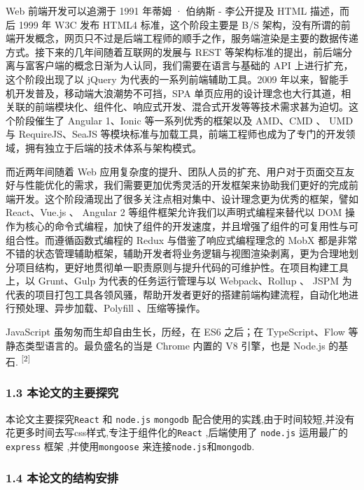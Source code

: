\documentclass[]{article}
\begin{document}
Web 前端开发可以追溯于 1991 年蒂姆 · 伯纳斯 - 李公开提及 HTML 描述，而后
1999 年 W3C 发布 HTML4 标准，这个阶段主要是 B/S
架构，没有所谓的前端开发概念，网页只不过是后端工程师的顺手之作，服务端渲染是主要的数据传递方式。接下来的几年间随着互联网的发展与
REST
等架构标准的提出，前后端分离与富客户端的概念日渐为人认同，我们需要在语言与基础的
API 上进行扩充，这个阶段出现了以 jQuery 为代表的一系列前端辅助工具。2009
年以来，智能手机开发普及，移动端大浪潮势不可挡，SPA
单页应用的设计理念也大行其道，相关联的前端模块化、组件化、响应式开发、混合式开发等等技术需求甚为迫切。这个阶段催生了
Angular 1、Ionic 等一系列优秀的框架以及 AMD、CMD 、 UMD 与
RequireJS、SeaJS
等模块标准与加载工具，前端工程师也成为了专门的开发领域，拥有独立于后端的技术体系与架构模式。

而近两年间随着 Web
应用复杂度的提升、团队人员的扩充、用户对于页面交互友好与性能优化的需求，我们需要更加优秀灵活的开发框架来协助我们更好的完成前端开发。这个阶段涌现出了很多关注点相对集中、设计理念更为优秀的框架，譬如
React、Vue.js 、 Angular 2 等组件框架允许我们以声明式编程来替代以 DOM
操作为核心的命令式编程，加快了组件的开发速度，并且增强了组件的可复用性与可组合性。而遵循函数式编程的
Redux 与借鉴了响应式编程理念的 MobX
都是非常不错的状态管理辅助框架，辅助开发者将业务逻辑与视图渲染剥离，更为合理地划分项目结构，更好地贯彻单一职责原则与提升代码的可维护性。在项目构建工具上，以
Grunt、Gulp 为代表的任务运行管理与以 Webpack、Rollup 、 JSPM
为代表的项目打包工具各领风骚，帮助开发者更好的搭建前端构建流程，自动化地进行预处理、异步加载、Polyfill
、压缩等操作。

JavaScript 虽匆匆而生却自由生长，历经，在 ES6 之后；在 TypeScript、Flow
等静态类型语言的。最负盛名的当是 Chrome 内置的 V8 引擎，也是 Node.js
的基石. \textsuperscript{{[}2{]}}

\hypertarget{header-n90}{%
\subsubsection{1.3 本论文的主要探究}\label{header-n90}}

本论文主要探究\texttt{React} 和 \texttt{node.js} \texttt{mongodb}
配合使用的实践,由于时间较短,并没有花更多时间去写css样式,专注于组件化的\texttt{React}
,后端使用了 \texttt{node.js} 运用最广的 \texttt{express} 框架
,并使用\texttt{mongoose} 来连接\texttt{node.js}和\texttt{mongodb}.

\hypertarget{header-n93}{%
\subsubsection{1.4 本论文的结构安排}\label{header-n93}}
\end{document}
